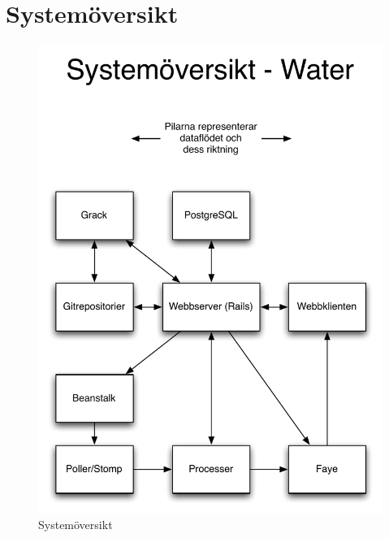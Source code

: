 \chapter{Systemöversikt}
\label{appendix:systemoversikt}

\begin{figure}
  \centering
  \includegraphics[width=15.0cm]{fig/misc/system_architecture_white_bg.pdf}             
  \caption[Systemöversikt]
  {Systemöversikt}
\end{figure}
